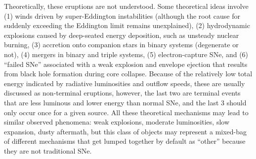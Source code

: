 
Theoretically, these eruptions are not understood.  %
Some
theoretical ideas involve (1)
winds driven by super-Eddington instabilities (although the root cause
for suddenly exceeding the Eddington limit remains unexplained), (2)
hydrodynamic explosions caused by deep-seated energy deposition, such
as unsteady nuclear burning, (3) accretion onto companion stars in
binary systems (degenerate or not), (4) mergers in binary and triple
systems, (5) electron-capture SNe, and (6) ``failed SNe'' associated
with a weak explosion and envelope ejection that results from black
hole formation during core collapse.
Because of the relatively low total energy indicated by
radiative luminosities and outflow speeds, these are usually discussed
as non-terminal eruptions, however, the last two are terminal events
that are less luminous and lower energy than normal SNe, and the last
3 should only occur once for a given source.
All these theoretical mechanisms
may lead to similar observed phenomena: weak explosions, moderate
luminosities, slow expansion, dusty aftermath, but this class of objects
may represent a mixed-bag of different mechanisms that get lumped
together by default as ``other'' because they are not traditional SNe.

